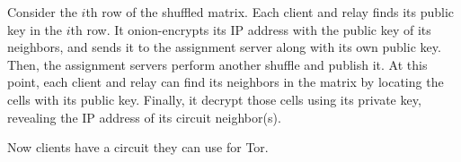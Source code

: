 Consider the $i$th row of the shuffled matrix. Each client and relay finds its 
public key in the $i$th row. It onion-encrypts its IP address with the public
key of its neighbors, and sends it to the assignment server along with its own
public key. Then, the assignment servers perform another shuffle and publish it. At this point, each client and relay can find its neighbors in the matrix by
locating the cells with its public key. Finally, it decrypt those cells using its
private key, revealing the IP address of its circuit neighbor(s).

Now clients have a circuit they can use for Tor.

		




